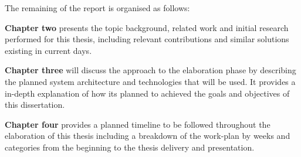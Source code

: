 The remaining of the report is organised as follows:

\textbf{Chapter two} presents the topic background, related work and initial research performed for this thesis, including relevant contributions and similar solutions existing in current days.

\textbf{Chapter three} will discuss the approach to the elaboration phase by describing the planned system architecture and technologies that will be used. It provides a in-depth explanation of how its planned to achieved the goals and objectives of this dissertation.

\textbf{Chapter four} provides a planned timeline to be followed throughout the elaboration of this thesis including a breakdown of the work-plan by weeks and categories from the beginning to the thesis delivery and presentation.